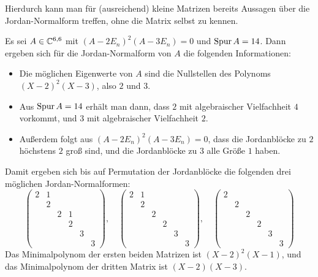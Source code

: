 \documentclass[a4paper,10pt,numbers = noenddot]{scrartcl}
\begin{document}
Hierdurch kann man für (ausreichend) kleine Matrizen bereits Aussagen über die Jordan-Nor\-mal\-form treffen, ohne die Matrix selbst zu kennen.

\begin{example}
  Es sei $A \in \mathbb{C}^{6, 6}$ mit $(A - 2E_n)^2 (A - 3E_n) = 0$ und $\operatorname{Spur} A = 14$.
  Dann ergeben sich für die Jordan-Normalform von $A$ die folgenden Informationen:
  \begin{itemize}
    \item
      Die möglichen Eigenwerte von $A$ sind die Nullstellen des Polynoms $(X-2)^2 (X-3)$, also $2$ und $3$.
    \item
      Aus $\operatorname{Spur} A = 14$ erhält man dann, dass $2$ mit algebraischer Vielfachheit $4$ vorkommt, und $3$ mit algebraischer Vielfachheit $2$.
    \item
      Außerdem folgt aus $(A - 2E_n)^2 (A - 3E_n) = 0$, dass die Jordanblöcke zu $2$ höchstens $2$ groß sind, und die Jordanblöcke zu $3$ alle Größe $1$ haben.
  \end{itemize}
  Damit ergeben sich bis auf Permutation der Jordanblöcke die folgenden drei möglichen Jordan-Normalformen:
  \[
    \begin{pmatrix}
      2 & 1 &   &   &   &   \\
        & 2 &   &   &   &   \\
        &   & 2 & 1 &   &   \\
        &   &   & 2 &   &   \\
        &   &   &   & 3 &   \\
        &   &   &   &   & 3
    \end{pmatrix},
    \quad
    \begin{pmatrix}
      2 & 1 &   &   &   &   \\
        & 2 &   &   &   &   \\
        &   & 2 &   &   &   \\
        &   &   & 2 &   &   \\
        &   &   &   & 3 &   \\
        &   &   &   &   & 3
    \end{pmatrix},
    \quad
    \begin{pmatrix}
      2 &   &   &   &   &   \\
        & 2 &   &   &   &   \\
        &   & 2 &   &   &   \\
        &   &   & 2 &   &   \\
        &   &   &   & 3 &   \\
        &   &   &   &   & 3
    \end{pmatrix}
  \]
  Das Minimalpolynom der ersten beiden Matrizen ist $(X-2)^2 (X-1)$, und das Minimalpolynom der dritten Matrix ist $(X-2)(X-3)$.
\end{example}
\end{document}
